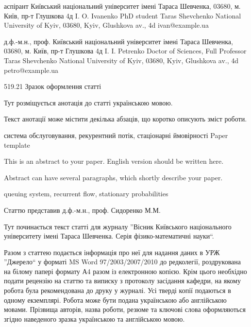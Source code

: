 \documentclass{KnuBulletin}
\begin{document}


\author
{І. O. Іваненко} %
{аспірант} %
{Київський національний університет імені Тараса Шевченка, 03680, м. Київ, пр-т Глушкова 4д} %
{I. O. Ivanenko}
{PhD student}
{Taras Shevchenko National University of Kyiv, 03680, Kyiv, Glushkova av., 4d}
{ivan@example.ua} %

\author
{І. І. Петренко}
{д.ф.-м.н., проф.}
{Київський національний університет імені Тараса Шевченка, 03680, м. Київ, пр-т Глушкова 4д}
{I. I. Petrenko}
{Doctor of Sciences, Full Professor}
{Taras Shevchenko National University of Kyiv, 03680, Kyiv, Glushkova av., 4d}
{petro@example.ua}

\header
{519.21} %
{Зразок оформлення статті}
{
    Тут розміщується анотація до статті українською мовою.
    
    Текст анотації може містити декілька абзаців, що 
    коротко описують зміст роботи.
}
{система обслуговування, рекурентний потік, стаціонарні ймовірності}
{Paper template}
{
	This is an abstract to your paper. English version should be written here.
	
	Abstract can have several paragraphs, which shortly describe your paper.
}
{queuing system, recurrent flow, stationary probabilities}

Статтю представив д.ф.-м.н., проф. Сидоренко М.М. 

\begin{multicols}{2}
    \noindent %
    
    Тут починається текст статті для журналу ''Вісник Київського національного університету імені Тараса Шевченка. Серія фізико-математичні науки``. 

	Разом з статтею подається інформація про неї для надання даних в УРЖ ''Джерело`` у форматі MS Word 97/2003/2007/2010 до редколегії, роздрукована на білому папері формату А4 разом із електронною копією. Крім цього необхідно подати рецензію на статтю та виписку з протоколу засідання кафедри, на якому робота була рекомендована до друку у журналі. Усі тверді копії подаються в одному екземплярі.
    Робота може бути подана українською або англійською мовами. Прізвища авторів, назва роботи, резюме та ключові слова оформляються згідно наведеного зразка українською та англійською мовою.
\end{multicols}
\end{document}
